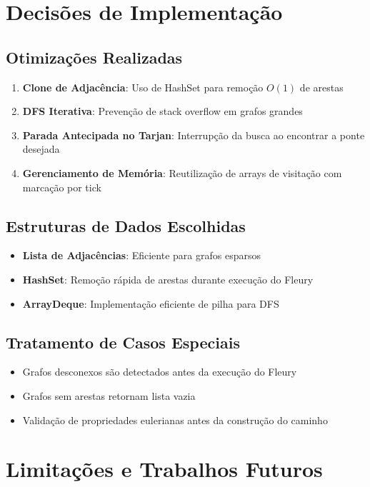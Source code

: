 \documentclass[12pt]{article}
\begin{document}
\section{Decisões de Implementação}

\subsection{Otimizações Realizadas}

\begin{enumerate}
\item \textbf{Clone de Adjacência}: Uso de HashSet para remoção $O(1)$ de arestas
\item \textbf{DFS Iterativa}: Prevenção de stack overflow em grafos grandes
\item \textbf{Parada Antecipada no Tarjan}: Interrupção da busca ao encontrar a ponte desejada
\item \textbf{Gerenciamento de Memória}: Reutilização de arrays de visitação com marcação por tick
\end{enumerate}

\subsection{Estruturas de Dados Escolhidas}

\begin{itemize}
\item \textbf{Lista de Adjacências}: Eficiente para grafos esparsos
\item \textbf{HashSet}: Remoção rápida de arestas durante execução do Fleury
\item \textbf{ArrayDeque}: Implementação eficiente de pilha para DFS
\end{itemize}

\subsection{Tratamento de Casos Especiais}

\begin{itemize}
\item Grafos desconexos são detectados antes da execução do Fleury
\item Grafos sem arestas retornam lista vazia
\item Validação de propriedades eulerianas antes da construção do caminho
\end{itemize}

\section{Limitações e Trabalhos Futuros}
\end{document}
